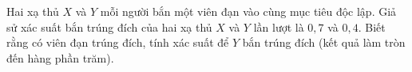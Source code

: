 \begin{ex}
Hai xạ thủ $X$ và $Y$ mỗi người bắn một viên đạn vào cùng mục tiêu độc lập. Giả sử xác suất bắn trúng đích của hai xạ thủ $X$ và $Y$ lần lượt là $0{,}7$ và $0{,}4$. Biết rằng có viên đạn trúng đích, tính xác suất để $Y$ bắn trúng đích (kết quả làm tròn đến hàng phần trăm).
\end{ex}
